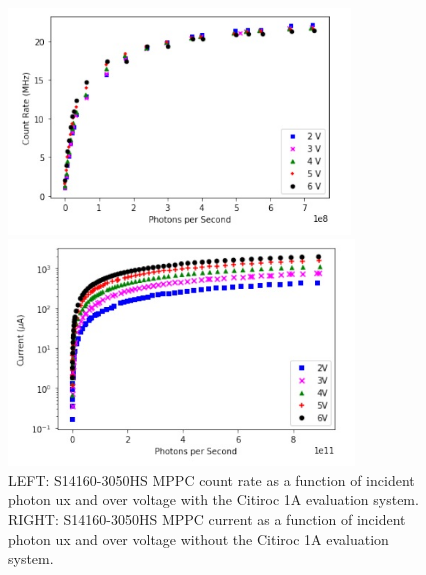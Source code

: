 \documentclass{article}
\begin{document}
\begin{figure}[ht]

  \begin{minipage}[b]{0.49\textwidth}
    \centering     
    \includegraphics[height=6cm]{images/figura8.jpg}
  \end{minipage}
  \hfill
  \begin{minipage}[b]{0.49\textwidth}
    \centering     
    \includegraphics[height=6cm]{images/figura9.jpg}
  \end{minipage}
     
\caption{LEFT: S14160-3050HS MPPC count rate as a function of incident photon ux and over voltage with the Citiroc 1A evaluation system. RIGHT: S14160-3050HS MPPC current as a function of incident photon ux and over voltage without the Citiroc 1A evaluation system.}
\label{fig:PhotonsPerSecond}
    
\end{figure}
\end{document}
